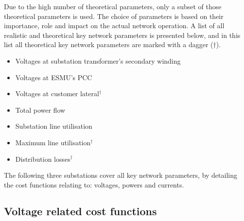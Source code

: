 Due to the high number of theoretical parameters, only a subset of those theoretical parameters is used.
The choice of parameters is based on their importance, role and impact on the actual network operation.
A list of all realistic and theoretical key network parameters is presented below, and in this list all theoretical key network parameters are marked with a dagger ($\dagger$).

\begin{itemize}
	\item Voltages at substation transformer's secondary winding
	\item Voltages at ESMU's PCC
	\item Voltages at customer lateral$^{\dagger}$
	\item Total power flow
	\item Substation line utilisation
	\item Maximum line utilisation$^{\dagger}$
	\item Distribution losses$^{\dagger}$
\end{itemize}


The following three substations cover all key network parameters, by detailing the cost functions relating to: voltages, powers and currents.

\subsection{Voltage related cost functions}
\label{ch1:subsec:voltages-related-cost-functions}



